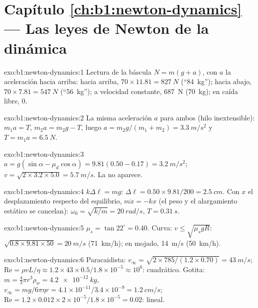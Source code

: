 \section*{Capítulo \ref{ch:b1:newton-dynamics} --- Las leyes de Newton de la dinámica}

\begin{solution}{exo:b1:newton-dynamics:1}
Lectura de la báscula $N = m(g + a)$, con $a$ la aceleración hacia arriba:
hacia arriba, $70 \times 11.81 = \qty{827}{N}$ (``\qty{84}{kg}''); hacia
abajo, $70 \times 7.81 =
\qty{547}{N}$ (``\qty{56}{kg}''); a velocidad constante, \qty{687}{N}
(\qty{70}{kg}); en caída libre, $0$.
\end{solution}

\begin{solution}{exo:b1:newton-dynamics:2}
La misma aceleración $a$ para ambos (hilo inextensible): $m_1a = T$,
$m_2a = m_2g - T$, luego $a = m_2g/(m_1 + m_2) = \qty{3.3}{m/s^2}$ y
$T = m_1a = \qty{6.5}{N}$.
\end{solution}

\begin{solution}{exo:b1:newton-dynamics:3}
$a = g(\sin\alpha - \mu_d\cos\alpha) = 9.81(0.50 - 0.17) = \qty{3.2}{m/s^2}$;
$v = \sqrt{2 \times 3.2 \times 5.0} = \qty{5.7}{m/s}$. La  no aparece.
\end{solution}

\begin{solution}{exo:b1:newton-dynamics:4}
$k\Delta\ell = mg$: $\Delta\ell = 0.50 \times 9.81/200 = \qty{2.5}{cm}$.
Con $x$ el desplazamiento respecto del equilibrio, $m\ddot x = -kx$ (el
peso y el alargamiento estático se cancelan): $\omega_0 = \sqrt{k/m} = \qty{20}{rad/s}$,
$T = \qty{0.31}{s}$.
\end{solution}

\begin{solution}{exo:b1:newton-dynamics:5}
$\mu_s = \tan 22^\circ = 0.40$. Curva: $v \leq \sqrt{\mu_sgR}$: $\sqrt{0.8
\times 9.81 \times 50} = \qty{20}{m/s}$ (\qty{71}{km/h}); en mojado,
\qty{14}{m/s} (\qty{50}{km/h}).
\end{solution}

\begin{solution}{exo:b1:newton-dynamics:6}
Paracaidista: $v_\infty = \sqrt{2 \times 785/(1.2 \times 0.70)} = \qty{43}{m/s}$;
$\mathrm{Re} = \rho vL/\eta \approx 1.2 \times 43 \times 0.5/1.8\times10^{-5}
\approx 10^6$: cuadrático. Gotita: $m = \tfrac43\pi r^3\rho_w = \qty{4.2e-12}{kg}$,
$v_\infty = mg/6\pi\eta r = 4.1\times10^{-11}/3.4\times10^{-9} = \qty{1.2}{cm/s}$;
$\mathrm{Re} = 1.2 \times 0.012 \times 2\times10^{-5}/1.8\times10^{-5} = 0.02$:
lineal.
\end{solution}

